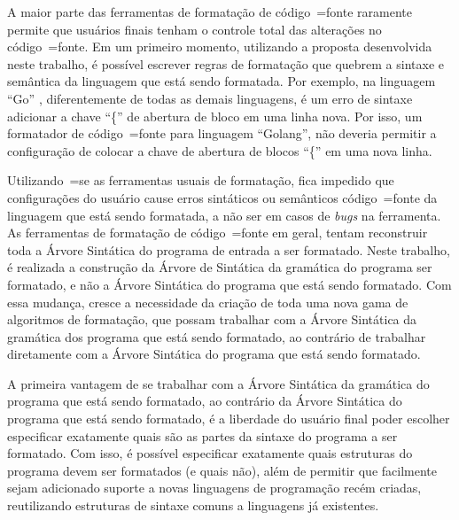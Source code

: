 {    A maior parte das ferramentas de formatação de código~=fonte raramente permite que usuários finais tenham o controle total das alterações no código~=fonte.
    Em um primeiro momento,
    utilizando a proposta desenvolvida neste trabalho,
    é possível escrever regras de formatação que quebrem a sintaxe e
    semântica da linguagem que está sendo formatada.
    Por exemplo,
    na linguagem ``Go'' \cite{programmingLanguageGolang},
    diferentemente de todas as demais linguagens,
    é um erro de sintaxe adicionar a chave ``\{'' de abertura de bloco em uma linha nova.
    Por isso,
    um formatador de código~=fonte para linguagem ``Golang'',
    não deveria permitir a configuração de colocar a chave de abertura de blocos ``\{'' em uma nova linha.

    Utilizando~=se as ferramentas usuais de formatação,
    fica impedido que configurações do usuário cause erros sintáticos ou
    semânticos código~=fonte da linguagem que está sendo formatada,
    a não ser em casos de \textit{bugs} na ferramenta.
    As ferramentas de formatação de código~=fonte em geral,
    tentam reconstruir toda a Árvore Sintática do programa de entrada a ser formatado.
    Neste trabalho,
    é realizada a construção da Árvore de Sintática da gramática do programa ser formatado,
    e não a Árvore Sintática do programa que está sendo formatado.
    Com essa mudança,
    cresce a necessidade da criação de toda uma nova gama de algoritmos de formatação,
    que possam trabalhar com a Árvore Sintática da gramática dos programa que está sendo formatado,
    ao contrário de trabalhar diretamente com a Árvore Sintática do programa que está sendo formatado.

    A primeira vantagem de se trabalhar com a Árvore Sintática da gramática do programa que está sendo formatado,
    ao contrário da Árvore Sintática do programa que está sendo formatado,
    é a liberdade do usuário final poder escolher especificar exatamente quais são as partes da sintaxe do programa a ser formatado.
    Com isso,
    é possível especificar exatamente quais estruturas do programa devem ser formatados (e quais não),
    além de permitir que facilmente sejam adicionado suporte a novas linguagens de programação recém criadas,
    reutilizando estruturas de sintaxe comuns a linguagens já existentes.

}
